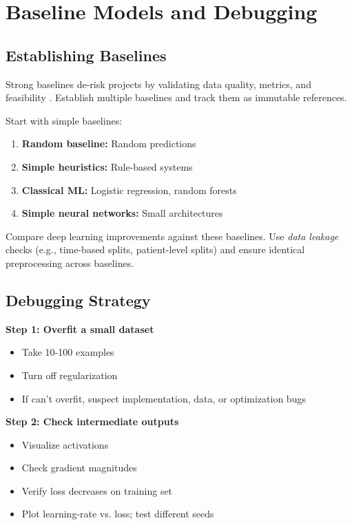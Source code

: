 
\section{Baseline Models and Debugging }
\label{sec:baselines-debugging}

\subsection{Establishing Baselines}

Strong baselines de-risk projects by validating data quality, metrics, and feasibility \textcite{GoodfellowEtAl2016,Prince2023}. Establish multiple baselines and track them as immutable references. 

Start with simple baselines:
\begin{enumerate}
    \item \textbf{Random baseline:} Random predictions
    \item \textbf{Simple heuristics:} Rule-based systems
    \item \textbf{Classical ML:} Logistic regression, random forests
    \item \textbf{Simple neural networks:} Small architectures
\end{enumerate}

Compare deep learning improvements against these baselines. Use \emph{data leakage}  checks (e.g., time-based splits, patient-level splits) and ensure identical preprocessing across baselines.

\subsection{Debugging Strategy}

\textbf{Step 1: Overfit a small dataset}
\begin{itemize}
    \item Take 10-100 examples
    \item Turn off regularization
    \item If can't overfit, suspect implementation, data, or optimization bugs
\end{itemize}

\textbf{Step 2: Check intermediate outputs}
\begin{itemize}
    \item Visualize activations
    \item Check gradient magnitudes
    \item Verify loss decreases on training set
    \item Plot learning-rate vs. loss; test different seeds
\end{itemize}

